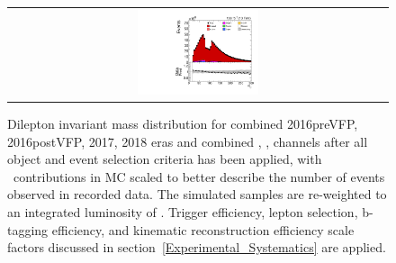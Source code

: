 \begin{figure}[htb]
    \begin{center}
        \begin{tabular}{c}
            \includegraphics[width=0.325\textwidth]{fig_fullRun2UL/controlplots/combined/DIMFull_fullSel.pdf}
        \end{tabular}
        \caption{\footnotesize Dilepton invariant mass distribution for combined 2016preVFP, 2016postVFP, 2017, 2018 eras and combined \ee, \emu, \mumu channels after all object and event selection criteria has been applied, with \zjets\ contributions in MC scaled to better describe the number of events observed in recorded data.
        The simulated samples are re-weighted to an integrated luminosity of \lumivalueRuniiUL.
        Trigger efficiency, lepton selection, b-tagging efficiency, and kinematic reconstruction efficiency scale factors discussed in section~\ref{Experimental_Systematics} are applied.
        }
        \label{Dilepton_Invariant_Mass}
    \end{center}
\end{figure}

\clearpage
